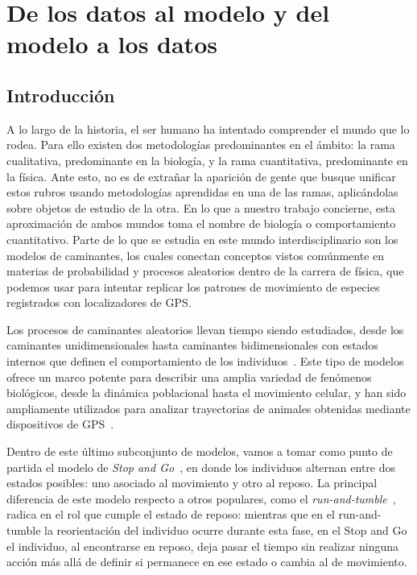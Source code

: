 \chapter{De los datos al modelo y del modelo a los datos}\label{Capitulo_2}
\chapterquote{}{}
\section{Introducción}\label{II:introduccion}

A lo largo de la historia, el ser humano ha intentado comprender el mundo que lo rodea. Para ello existen dos metodologías predominantes en el ámbito: la rama 
cualitativa, predominante en la biología, y la rama cuantitativa, predominante en la física. Ante esto, no es de extrañar la aparición de gente que busque 
unificar estos rubros usando metodologías aprendidas en una de las ramas, aplicándolas sobre objetos de estudio de la otra. En lo que a nuestro trabajo 
concierne, esta aproximación de ambos mundos toma el nombre de biología o comportamiento cuantitativo. Parte de lo que se estudia en este mundo interdisciplinario
son los modelos de caminantes, los cuales conectan conceptos vistos comúnmente en materias de probabilidad y procesos aleatorios dentro de la carrera de física, que 
podemos usar para intentar replicar los patrones de movimiento de especies registrados con localizadores de GPS.

Los procesos de caminantes aleatorios llevan tiempo siendo estudiados, desde los caminantes unidimensionales hasta caminantes bidimensionales con 
estados internos que definen el comportamiento de los individuos~\cite{codling2008}. Este tipo de modelos ofrece un marco potente para describir una 
amplia variedad de fenómenos biológicos, desde la dinámica poblacional hasta el movimiento celular, y han sido ampliamente utilizados para analizar 
trayectorias de animales obtenidas mediante dispositivos de GPS~\cite{bartumeus2005}.

Dentro de este último subconjunto de modelos, vamos a tomar como punto de partida el modelo de \textit{Stop and Go}~\cite{peruani2023stopandgo}, en donde 
los individuos alternan entre dos estados posibles: uno asociado al movimiento y otro al reposo. La principal diferencia de este modelo respecto a otros 
populares, como el \textit{run-and-tumble}~\cite{codling2008}, radica en el rol que cumple el estado de reposo: mientras que en el run-and-tumble la 
reorientación del individuo ocurre durante esta fase, en el Stop and Go el individuo, al encontrarse en reposo, deja pasar el tiempo sin realizar ninguna 
acción más allá de definir si permanece en ese estado o cambia al de movimiento.

